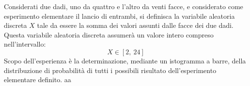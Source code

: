 Considerati due dadi, uno da quattro e l'altro da venti facce, e considerato come esperimento elementare il lancio di entrambi, si definisca la variabile aleatoria discreta $X$ tale da essere la somma dei valori assunti dalle facce dei due dadi. Questa variabile aleatoria discreta assumerà un valore intero compreso nell'intervallo:
\begin{equation}
	X\in[2,\ 24]
\end{equation}
Scopo dell'esperienza è la determinazione, mediante un istogramma a barre, della distribuzione di probabilità di tutti i possibili risultato dell'esperimento elementare definito. aa
